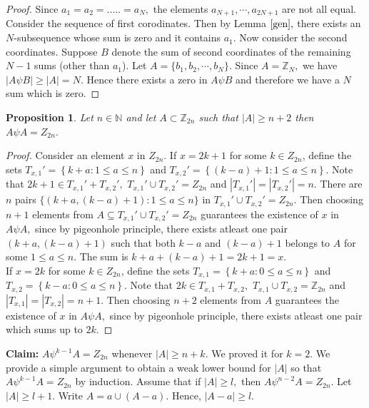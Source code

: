 \documentclass[reqno,10pt]{amsart}
\newtheorem{prop}{Proposition}[section]
\begin{document}
\begin{proof}
Since $a_1 = a_2 = ..... = a_N,$ the elements $a_{N+1}, \cdots, a_{2N+1}$ are not all equal. Consider the sequence of first corodinates. Then by Lemma $\ref{gen},$ there exists an $N$-subsequence whose sum is zero and it contains $a_1.$   Now consider the second coordinates. Suppose $B$ denote the sum of second coordinates of the remaining $N-1$ sums (other than $a_1$). Let $A = \{ b_1, b_2,\cdots, b_N\}.$  Since $A = \mathbb{Z}_N,$  we have $ |A \psi B | \geq |A| = N$. Hence there exists a zero in $A \psi B$ and therefore we have a $N$ sum which is zero. 	 
\end{proof}
\begin{prop}\label{prop1}
Let $n \in \mathbb{N}$ and let $A \subset \mathbb{Z}_{2n}$ such that $|A| \geq n+2$ then $A \psi A = Z_{2n}.$
\end{prop}
\begin{proof} Consider an element $x$ in $Z_{2n}$.  
If $x=2k+1$ for some $k \in Z_{2n}$, define the sets $T_{x,1}' = \left\lbrace k+a : 1 \leq a \leq n \right\rbrace$ and $T_{x,2}' = \left\lbrace (k-a)+1 : 1 \leq a \leq n \right\rbrace $. Note that $ 2k+1 \in T_{x,1}' + T_{x,2}' ,$  $T_{x,1}' \cup T_{x,2}' = Z_{2n} $ and $ |T_{x,1}'| = |T_{x,2}'| = n $. There are $n$ pairs $\{ ( k+a, (k-a)+1 ) : 1 \leq a \leq n \}$ in $T_{x,1}' \cup T_{x,2}' = Z_{2n} .$  Then choosing $n+1$ elements from $A \subseteq  T_{x,1}' \cup T_{x,2}' = Z_{2n} $  guarantees the existence of $x$ in $A \psi A,$ since by pigeonhole principle, there exists atleast one pair  $( k+a, (k-a)+1 )$ such that both $k-a$ and $(k-a)+1$ belongs to $A$ for some $ 1 \leq a \leq n.$ The sum
is  $k+a + (k-a)+1 = 2k+1=x.$\\
If $x=2k$ for some $k \in Z_{2n}$, define the sets $T_{x,1} = \left\lbrace k+a : 0 \leq a \leq n \right\rbrace  $ and $T_{x,2} = \left\lbrace k-a : 0 \leq a \leq n \right\rbrace  .$ Note that $ 2k \in T_{x,1} + T_{x,2}, $  $T_{x,1} \cup T_{x,2} = \mathbb{Z}_{2n} $ and $ |T_{x,1}| = |T_{x,2}| = n+1$. Then choosing $n+2$ elements from $A$ guarantees the existence of $x$ in  $A \psi A,$ since by pigeonhole principle, there exists atleast one pair which sums up to $2k.$
\end{proof} 
\textbf{ Claim:} $A \psi^{k-1} A=Z_{2n}$ whenever $|A| \geq n+k$.
We proved it for $k=2.$ We provide a simple argument to obtain a weak lower bound for $|A|$ so that $A \psi^{k-1} A=Z_{2n}$ by induction. Assume that if $|A|\geq l,$ then $A \psi^{n-2} A = Z_{2n}.$ Let $|A|\geq l+1.$
Write $A={a}\cup (A-{a})$. Hence, $|A-{a}|\geq l$.
\end{document}

